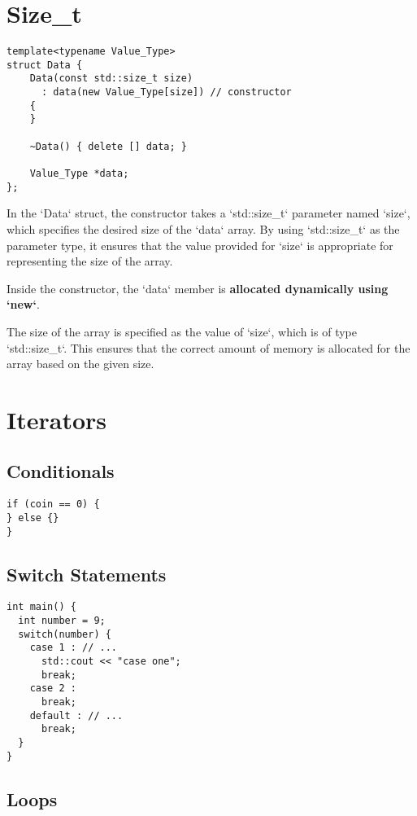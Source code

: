 \section{Size\_t}

\begin{verbatim}
template<typename Value_Type>
struct Data {
    Data(const std::size_t size)
      : data(new Value_Type[size]) // constructor
    {
    }

    ~Data() { delete [] data; }

    Value_Type *data;
};
\end{verbatim}

In the `Data` struct, the constructor takes a `std::size\_t` parameter named `size`,
which specifies the desired size of the `data` array. 
By using `std::size\_t` as the parameter type, 
it ensures that the value provided for `size` is appropriate for representing the size of the array.

Inside the constructor, the `data` member is \textbf{allocated dynamically using `new`}.

The size of the array is specified as the value of `size`, which is of type `std::size\_t`. 
This ensures that the correct amount of memory is allocated for the array based on the given size.

\section{Iterators}
\subsection{Conditionals}

\begin{verbatim}
if (coin == 0) {
} else {}
}
\end{verbatim}

\subsection{Switch Statements}

\begin{verbatim}
int main() {
  int number = 9;
  switch(number) {
    case 1 : // ...
      std::cout << "case one";
      break;
    case 2 :
      break;
    default : // ...
      break;
  }
}
\end{verbatim}

\subsection{Loops}


